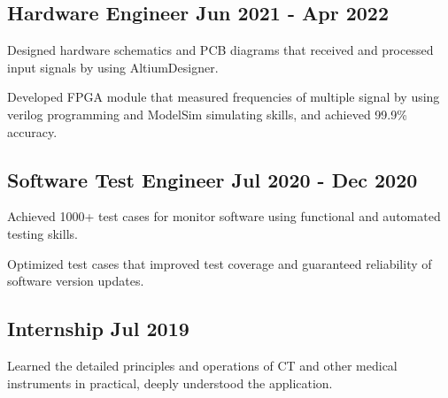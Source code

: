 \documentclass[a4paper,12pt]{article}
\begin{document}


\vspace*{10pt}
\subsection{{Hardware Engineer }\hfill Jun 2021 - Apr 2022}
\begin{zitemize}
\item Designed hardware schematics and PCB diagrams that received and processed input signals by using AltiumDesigner. 
\item Developed FPGA module that measured frequencies of multiple signal by using verilog programming and ModelSim simulating skills, and achieved 99.9\% accuracy.
\end{zitemize}

\vspace*{6pt}
\subsection{{Software Test Engineer }\hfill Jul 2020 - Dec 2020}
\begin{zitemize}
\item Achieved 1000+ test cases for monitor software using functional and automated testing skills. 
\item Optimized test cases that improved test coverage and guaranteed reliability of software version updates. 
\end{zitemize}

\vspace*{6pt}
\subsection{{Internship }\hfill Jul 2019}
\begin{zitemize}
\item Learned the detailed principles and operations of CT and other medical instruments in practical, deeply understood the application.
\end{zitemize}
\end{document}
